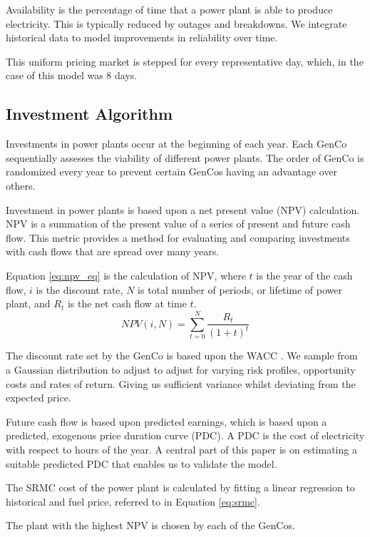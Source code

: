 \documentclass[final,3p,times,twocolumn,numbers]{elsarticle}
\begin{document}
 Availability is the percentage of time that a power plant is able to produce electricity. This is typically reduced by outages and breakdowns. We integrate historical data to model improvements in reliability over time.
 
 This uniform pricing market is stepped for every representative day, which, in the case of this model was 8 days. 
 
 \subsection{Investment Algorithm}
 
Investments in power plants occur at the beginning of each year. Each GenCo sequentially assesses the viability of different power plants. The order of GenCo is randomized every year to prevent certain GenCos having an advantage over others.

Investment in power plants is based upon a net present value (NPV) calculation. NPV is a summation of the present value of a series of present and future cash flow. This metric provides a method for evaluating and comparing investments with cash flows that are spread over many years. 

Equation \ref{eq:npv_eq} is the calculation of NPV, where $t$ is the year of the cash flow, $i$ is the discount rate, $N$ is total number of periods, or lifetime of power plant, and $R_t$ is the net cash flow at time $t$.
\begin{equation} \label{eq:npv_eq}
NPV(i, N) = \sum_{t=0}^{N}\frac{R_t}{(1+t)^t}
\end{equation}

The discount rate set by the GenCo is based upon the WACC \cite{KincheloeStephenC1990TWAC}. We sample from a Gaussian distribution to adjust to adjust for varying risk profiles, opportunity costs and rates of return. Giving us sufficient variance whilst deviating from the expected price.

Future cash flow is based upon predicted earnings, which is based upon a predicted, exogenous price duration curve (PDC). A PDC is the cost of electricity with respect to hours of the year. A central part of this paper is on estimating a suitable predicted PDC that enables us to validate the model.

The SRMC cost of the power plant is calculated by fitting a linear regression to historical  and fuel price, referred to in Equation \ref{eq:srmc}. 

The plant with the highest NPV is chosen by each of the GenCos.
 
\end{document}
